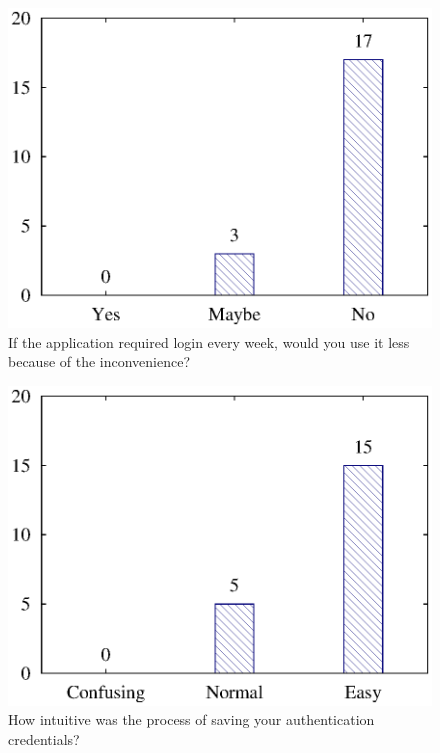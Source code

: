 \begin{figure}[H]
\centering
\includegraphics[scale=.7]{files/question8/question8.eps}
\caption{If the application required login every week, would you use it less because of the inconvenience?}
\label{fig:digraph}
\end{figure}

\begin{figure}[H]
\centering
\includegraphics[scale=.7]{files/question9/question9.eps}
\caption{How intuitive was the process of saving your authentication credentials?}
\label{fig:digraph}
\end{figure}

